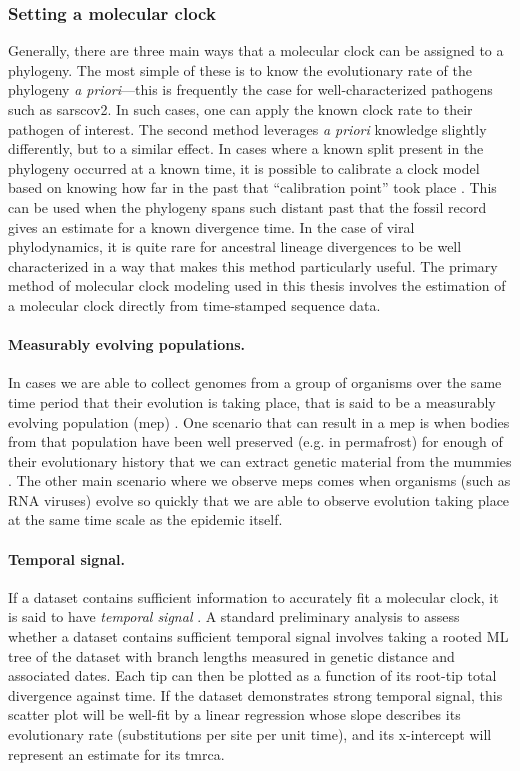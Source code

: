 \subsubsection{Setting a molecular clock}
Generally, there are three main ways that a molecular clock can be assigned to a phylogeny.
The most simple of these is to know the evolutionary rate of the phylogeny \textit{a priori}---this is frequently the case for well-characterized pathogens such as \gls{sarscov2}.
In such cases, one can apply the known clock rate to their pathogen of interest.
The second method leverages \textit{a priori} knowledge slightly differently, but to a similar effect.
In cases where a known split present in the phylogeny occurred at a known time, it is possible to calibrate a clock model based on knowing how far in the past that ``calibration point'' took place \citep{ho2009accounting}.
This can be used when the phylogeny spans such distant past that the fossil record gives an estimate for a known divergence time.
In the case of viral phylodynamics, it is quite rare for ancestral lineage divergences to be well characterized in a way that makes this method particularly useful.
The primary method of molecular clock modeling used in this thesis involves the estimation of a molecular clock directly from time-stamped sequence data.

\paragraph*{Measurably evolving populations.}
In cases we are able to collect genomes from a group of organisms over the same time period that their evolution is taking place, that is said to be a measurably evolving population (\gls{mep}) \citep{drummond2003measurably}.
One scenario that can result in a \gls{mep} is when bodies from that population have been well preserved (e.g. in permafrost) for enough of their evolutionary history that we can extract genetic material from the mummies \citep{shapiro2004rise}.
The other main scenario where we observe \gls{mep}s comes when organisms (such as RNA viruses) evolve so quickly that we are able to observe evolution taking place at the same time scale as the epidemic itself.

\paragraph*{Temporal signal.}
If a dataset contains sufficient information to accurately fit a molecular clock, it is said to have \textit{temporal signal} \citep{duchene2020bayesian}.
A standard preliminary analysis to assess whether a dataset contains sufficient temporal signal involves taking a rooted ML tree of the dataset with branch lengths measured in genetic distance and associated dates.
Each tip can then be plotted as a function of its root-tip total divergence against time.
If the dataset demonstrates strong temporal signal, this scatter plot will be well-fit by a linear regression whose slope describes its evolutionary rate (substitutions per site per unit time), and its x-intercept will represent an estimate for its \gls{tmrca}.

